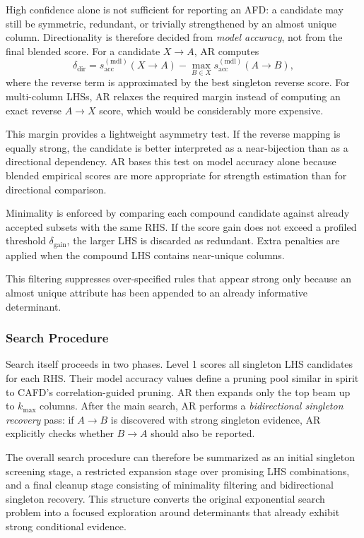 \documentclass[conference]{IEEEtran}
\begin{document}
High confidence alone is not sufficient for reporting an AFD: a candidate may still be symmetric, redundant, or trivially strengthened by an almost unique column. Directionality is therefore decided from \emph{model accuracy}, not from the final blended score. For a candidate $X \to A$, AR computes
\begin{equation}
    \delta_{\mathrm{dir}} = s_{\mathrm{acc}}^{(\mathrm{mdl})}(X \to A) - \max_{B \in X} s_{\mathrm{acc}}^{(\mathrm{mdl})}(A \to B),
\end{equation}
where the reverse term is approximated by the best singleton reverse score. For multi-column LHSs, AR relaxes the required margin instead of computing an exact reverse $A \to X$ score, which would be considerably more expensive.

This margin provides a lightweight asymmetry test. If the reverse mapping is equally strong, the candidate is better interpreted as a near-bijection than as a directional dependency. AR bases this test on model accuracy alone because blended empirical scores are more appropriate for strength estimation than for directional comparison.

Minimality is enforced by comparing each compound candidate against already accepted subsets with the same RHS. If the score gain does not exceed a profiled threshold $\delta_{\mathrm{gain}}$, the larger LHS is discarded as redundant. Extra penalties are applied when the compound LHS contains near-unique columns.

This filtering suppresses over-specified rules that appear strong only because an almost unique attribute has been appended to an already informative determinant.

\subsubsection{Search Procedure}

Search itself proceeds in two phases. Level 1 scores all singleton LHS candidates for each RHS. Their model accuracy values define a pruning pool similar in spirit to CAFD's correlation-guided pruning. AR then expands only the top beam up to $k_{\max}$ columns. After the main search, AR performs a \emph{bidirectional singleton recovery} pass: if $A \to B$ is discovered with strong singleton evidence, AR explicitly checks whether $B \to A$ should also be reported.

The overall search procedure can therefore be summarized as an initial singleton screening stage, a restricted expansion stage over promising LHS combinations, and a final cleanup stage consisting of minimality filtering and bidirectional singleton recovery. This structure converts the original exponential search problem into a focused exploration around determinants that already exhibit strong conditional evidence.
\end{document}
